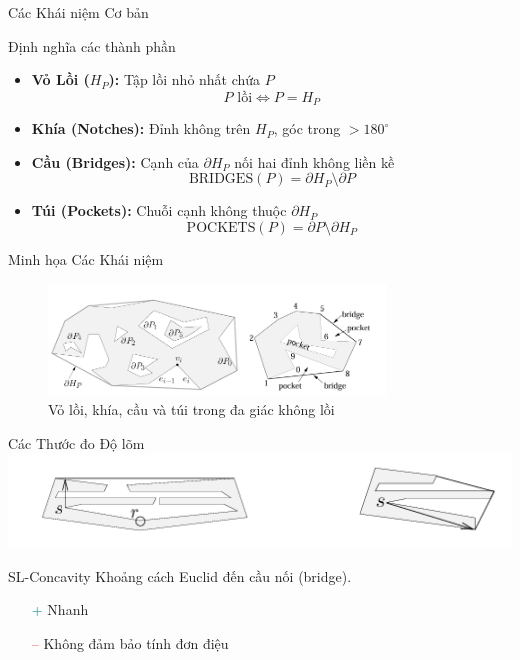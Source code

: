 \documentclass[aspectratio=169]{beamer}
\begin{document}
\begin{frame}{Các Khái niệm Cơ bản}

    \begin{block}{Định nghĩa các thành phần}
        \begin{itemize}
            \item \textbf{Vỏ Lồi ($H_P$):} Tập lồi nhỏ nhất chứa $P$
                  \[
                      P \text{ lồi} \Leftrightarrow P = H_P
                  \]

            \item \textbf{Khía (Notches):} Đỉnh không trên $H_P$, góc trong $> 180^\circ$

            \item \textbf{Cầu (Bridges):} Cạnh của $\partial H_P$ nối hai đỉnh không liền kề
                  \[
                      \text{BRIDGES}(P) = \partial H_P \setminus \partial P
                  \]

            \item \textbf{Túi (Pockets):} Chuỗi cạnh không thuộc $\partial H_P$
                  \[
                      \text{POCKETS}(P) = \partial P \setminus \partial H_P
                  \]
        \end{itemize}
    \end{block}

\end{frame}

\begin{frame}{Minh họa Các Khái niệm}
    \begin{figure}
        \centering
        \includegraphics[width=0.8\textwidth]{../imgs/ACD-5.png}
        \caption{\small Vỏ lồi, khía, cầu và túi trong đa giác không lồi}
    \end{figure}
\end{frame}

\begin{frame}{Các Thước đo Độ lõm}
    \centering
    \includegraphics[width=0.8\linewidth]{../imgs/ACD-2.png}

    \begin{block}{SL-Concavity}
        Khoảng cách Euclid đến cầu nối (bridge).
        \begin{itemize}
            \item[\textcolor{teal}{+}] Nhanh
            \item[\textcolor{red}{--}] Không đảm bảo tính đơn điệu
        \end{itemize}
    \end{block}

\end{frame}
\end{document}
